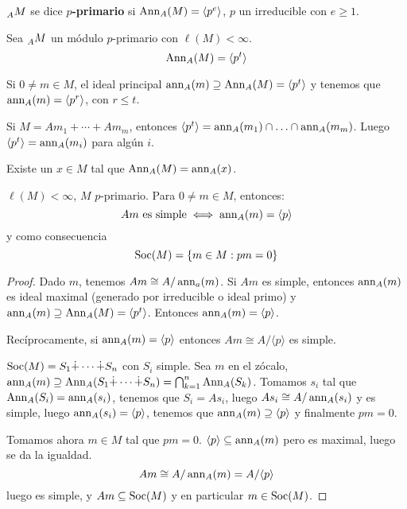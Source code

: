 \begin{df}
  \(\prescript{}{A}{M}\) se dice \textbf{\(p\)-primario} si
  \(\operatorname{Ann}_A(M)=\langle p^e\rangle\), \(p\) un irreducible con \(e \ge 1\).
\end{df}

\begin{obs}
  Sea \(\prescript{}{A}{M}\) un módulo \(p\)-primario con \(\ell(M) < \infty\).
  \[
    \operatorname{Ann}_A(M)=\langle p^t\rangle
  \]

  Si \(0\neq m\in M\), el ideal principal \(\operatorname{ann}_A(m)\supseteq \operatorname{Ann}_A(M)=\langle p^t
  \rangle\) y tenemos que \(\operatorname{ann}_A(m)=\langle p^r\rangle \),
  con \(r\le t\).

  Si \(M=Am_1+\cdots+Am_m\), entonces \(\langle p^t\rangle
  =\operatorname{ann}_A(m_1)\cap\ldots\cap\operatorname{ann}_A(m_m)\). Luego
  \(\langle p^t\rangle =\operatorname{ann}_A(m_i)\) para algún \(i\).
\end{obs}

\begin{cor}
  Existe un \(x \in M\) tal que \(\operatorname{Ann}_A(M)=\operatorname{ann}_A(x)\).
\end{cor}

\begin{lema}
  \(\ell(M)<\infty\), \(M\) \(p\)-primario. Para \(0\neq m\in M\),
  entonces:
  \[
    Am\textrm{ es simple} \iff \operatorname{ann}_A(m)=\langle p\rangle
  \]
  y como consecuencia
  \[
    \operatorname{Soc}(M)=\{m\in M: pm=0\}
  \]
\end{lema}
\begin{proof}
  Dado \(m\), tenemos \(Am\cong A/\operatorname{ann}_a(m)\). Si \(Am\) es simple,
  entonces \(\operatorname{ann}_A(m)\) es ideal maximal (generado por irreducible o ideal
  primo) y
  \(\operatorname{ann}_A(m)\supseteq\operatorname{Ann}_A(M)=\langle p^t\rangle\).
  Entonces \(\operatorname{ann}_A(m)=\langle p\rangle\).

  Recíprocamente, si \(\operatorname{ann}_A(m)=\langle p\rangle\) entonces
  \(Am\cong A/\langle p\rangle\) es simple.

  \(\operatorname{Soc}(M)=S_1\dot{+}\cdots\dot{+}S_n\) con \(S_i\) simple.
  Sea \(m\) en el zócalo, \(\operatorname{ann}_A(m)
  \supseteq\operatorname{Ann}_A(S_1\dot{+}\cdots\dot{+}S_n)=
  \bigcap_{k=1}^{n} \operatorname{Ann}_A(S_k)\). Tomamos \(s_i\) tal que
  \(\operatorname{Ann}_A(S_i)=\operatorname{ann}_A(s_i)\), tenemos que \(S_i=As_i\), luego
  \(As_i\cong A/\operatorname{ann}_A(s_i)\) y es simple, luego
  \(\operatorname{ann}_A(s_i)=\langle p\rangle\),
  tenemos que \(\operatorname{ann}_A(m)\supseteq\langle p\rangle\) y finalmente
  \(pm=0\).

  Tomamos ahora \(m\in M\) tal que \(pm=0\). \(\langle p\rangle
  \subseteq\operatorname{ann}_A(m)\) pero es maximal, luego se da la igualdad.
  \[
    Am\cong A/\operatorname{ann}_A(m)= A/\langle p\rangle
  \]
  luego es simple, y \(Am\subseteq\operatorname{Soc}(M)\) y en particular
  \(m\in\operatorname{Soc}(M)\).

\end{proof}

